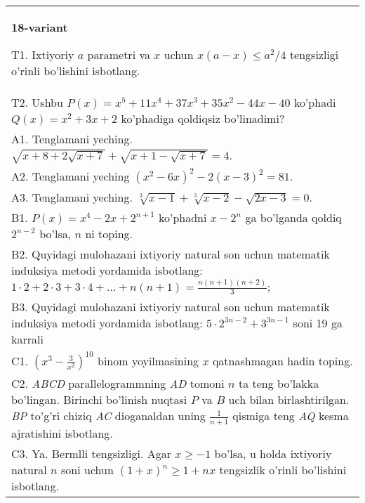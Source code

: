 \documentclass{article}
\begin{document}
\begin{tabular}{m{17cm}}
\textbf{18-variant}
\newline

T1. Ixtiyoriy \(a\) parametri va \(x\) uchun \(x(a - x) \leq a^{2}/4\) tengsizligi o'rinli bo'lishini isbotlang. \\
T2. Ushbu \(P(x) = x^{5} + 11x^{4} + 37x^{3} + 35x^{2} - 44x - 40\) ko'phadi \(Q(x) = x^{2} + 3x + 2\) ko'phadiga qoldiqsiz bo'linadimi? \\
A1. Tenglamani yeching. \(\sqrt{x + 8 + 2\sqrt{x + 7}} + \sqrt{x + 1 - \sqrt{x + 7}} = 4\). \\
A2. Tenglamani yeching \(\left( x^{2} - 6x \right)^{2} - 2(x - 3)^{2} = 81\). \\
A3. Tenglamani yeching. \(\sqrt[3]{x - 1} + \sqrt[3]{x - 2} - \sqrt{2x - 3} = 0\). \\
B1. \(P(x) = x^{4} - 2x + 2^{n + 1}\) ko'phadni \(x - 2^{n}\) ga bo'lganda qoldiq \(2^{n - 2}\) bo'lsa, \(n\) ni toping. \\
B2. Quyidagi mulohazani ixtiyoriy natural son uchun matematik induksiya metodi yordamida isbotlang: \(1 \cdot 2 + 2 \cdot 3 + 3 \cdot 4 + ... + n(n + 1) = \frac{n(n + 1)(n + 2)}{3}\); \\
B3. Quyidagi mulohazani ixtiyoriy natural son uchun matematik induksiya metodi yordamida isbotlang: \(5 \cdot 2^{3n - 2} + 3^{3n - 1}\) soni 19 ga karrali \\
C1. \(\left( x^{3} - \frac{3}{x^{2}} \right)^{10}\) binom yoyilmasining \(x\) qatnashmagan hadin toping. \\
C2. \emph{ABCD} parallelogrammning \emph{AD} tomoni \(n\) ta teng bo'lakka bo'lingan. Birinchi bo'linish nuqtasi \(P\) va \(B\) uch bilan birlashtirilgan. \emph{BP} to'g'ri chiziq \emph{AC} dioganaldan uning \(\frac{1}{n + 1}\) qismiga teng \emph{AQ} kesma ajratishini isbotlang. \\
C3. Ya. Bermlli tengsizligi. Agar \(x \geq - 1\) bo'lsa, u holda ixtiyoriy natural \(n\) soni uchun \((1 + x)^{n} \geq 1 + nx\) tengsizlik o'rinli bo'lishini isbotlang. \\

\end{tabular}
\vspace{1cm}
\end{document}
